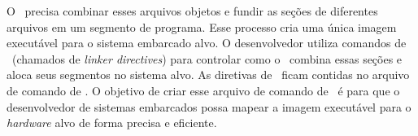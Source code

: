 


O \linker\ precisa combinar esses arquivos objetos e fundir as seções de diferentes arquivos em um segmento de programa. Esse processo cria uma única imagem executável para o sistema embarcado alvo. O desenvolvedor utiliza comandos de \linker\ (chamados de \textit{linker directives}) para controlar como o \linker\ combina essas seções e aloca seus segmentos no sistema alvo. As diretivas de \linker\ ficam contidas no arquivo de comando de \linker. O objetivo de criar esse arquivo de comando de \linker\ é para que o desenvolvedor de sistemas embarcados possa mapear a imagem executável para o \textit{hardware} alvo de forma precisa e eficiente. 

